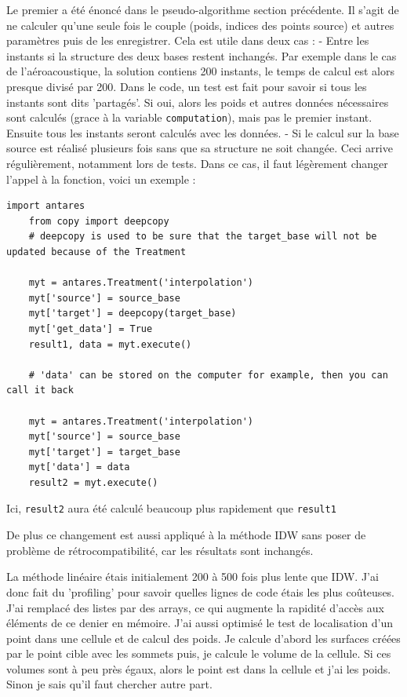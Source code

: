 Le premier a été énoncé dans le pseudo-algorithme section précédente. Il s'agit de ne calculer qu'une seule fois le couple (poids, indices des points source) et autres paramètres puis de les enregistrer. Cela est utile dans deux cas :
\vspace{0.5cm}
- Entre les instants si la structure des deux bases restent inchangés. Par exemple dans le cas de l'aéroacoustique, la solution contiens 200 instants, le temps de calcul est alors presque divisé par 200. Dans le code, un test est fait pour savoir si tous les instants sont dits 'partagés'. Si oui, alors les poids et autres données nécessaires sont calculés (grace à la variable \texttt{computation}), mais pas le premier instant. Ensuite tous les instants seront calculés avec les données.
\vspace{0.5cm}
- Si le calcul sur la base source est réalisé plusieurs fois sans que sa structure ne soit changée. Ceci arrive régulièrement, notamment lors de tests. Dans ce cas, il faut légèrement changer l'appel à la fonction, voici un exemple :

\begin{lstlisting}[caption=Exemple de réutilisation des données, label={lst:antares}]
    import antares
    from copy import deepcopy
    # deepcopy is used to be sure that the target_base will not be updated because of the Treatment

    myt = antares.Treatment('interpolation')
    myt['source'] = source_base
    myt['target'] = deepcopy(target_base)
    myt['get_data'] = True
    result1, data = myt.execute()

    # 'data' can be stored on the computer for example, then you can call it back

    myt = antares.Treatment('interpolation')
    myt['source'] = source_base
    myt['target'] = target_base
    myt['data'] = data
    result2 = myt.execute()
\end{lstlisting}

Ici, \texttt{result2} aura été calculé beaucoup plus rapidement que \texttt{result1}

De plus ce changement est aussi appliqué à la méthode IDW sans poser de problème de rétrocompatibilité, car les résultats sont inchangés.

\vspace{0.5cm}

La méthode linéaire étais initialement 200 à 500 fois plus lente que IDW. J'ai donc fait du 'profiling' pour savoir quelles lignes de code étais les plus coûteuses. J'ai remplacé des listes par des arrays, ce qui augmente la rapidité d'accès aux éléments de ce denier en mémoire.
J'ai aussi optimisé le test de localisation d'un point dans une cellule et de calcul des poids.
Je calcule d'abord les surfaces créées par le point cible avec les sommets puis, je calcule le volume de la cellule. Si ces volumes sont à peu près égaux, alors le point est dans la cellule et j'ai les poids. Sinon je sais qu'il faut chercher autre part.


